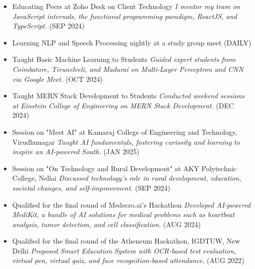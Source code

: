 \documentclass[letterpaper,11pt]{article}
\newcommand{\resheading}[1]{\textbf{\sffamily{\mbox{~}{\large #1} \vphantom{p\^{E}}}}}
\begin{document}
\newpage
\resheading{Achievements/Activities}
\begin{itemize}
    \item Educating Peers at Zoho Desk on Client Technology  
          \textit{I mentor my team on JavaScript internals, the functional programming paradigm, ReactJS, and TypeScript.} (SEP 2024)
    \vspace{-2mm}
    
    \item Learning NLP and Speech Processing nightly at a study group meet (DAILY)
    \vspace{-2mm}

    \item Taught Basic Machine Learning to Students  
          \textit{Guided expert students from Coimbatore, Tirunelveli, and Madurai on Multi-Layer Perceptron and CNN via Google Meet.} (OCT 2024)
    \vspace{-2mm}

    \item Taught MERN Stack Development to Students  
          \textit{Conducted weekend sessions at Einstein College of Engineering on MERN Stack Development.} (DEC 2024)
    \vspace{-2mm}

    \item Session on "Meet AI" at Kamaraj College of Engineering and Technology, Virudhunagar  
          \textit{Taught AI fundamentals, fostering curiosity and learning to inspire an AI-powered South.} (JAN 2025)
    \vspace{-2mm}

    \item Session on "On Technology and Rural Development" at AKY Polytechnic College, Nellai  
          \textit{Discussed technology’s role in rural development, education, societal changes, and self-improvement.} (SEP 2024)
    \vspace{-2mm}

    \item Qualified for the final round of Medecro.ai's Hackathon  
          \textit{Developed AI-powered MediKit, a bundle of AI solutions for medical problems such as heartbeat analysis, tumor detection, and cell classification.} (AUG 2024)
    \vspace{-2mm}

    \item Qualified for the final round of the Atheneum Hackathon, IGDTUW, New Delhi  
          \textit{Proposed Smart Education System with OCR-based test evaluation, virtual pen, virtual quiz, and face recognition-based attendance.} (AUG 2022)
    \vspace{-2mm}


\end{itemize}
\end{document}
